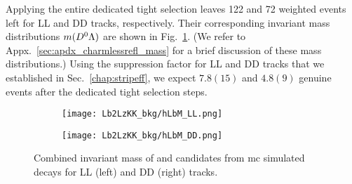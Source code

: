 Applying the entire dedicated \decay{\Lb}{\Dz\Lz} tight selection leaves 122 and 72 weighted events left for \gls{LL} and \gls{DD} tracks, respectively.
Their corresponding invariant mass distributions $m({{D}^0}{\Lambda})$ are shown in Fig.~\ref{fig:LbToLzKK_bkg_hLbM}. (We refer to Appx.~\ref{sec:apdx_charmlessrefl_mass} for a brief discussion of these mass distributions.)
Using the suppression factor for \gls{LL} and \gls{DD} tracks that we established in Sec.~\ref{chap:stripeff}, we expect $7.8(15)$ and $4.8(9)$ genuine \decay{\Lb}{\Lz\Kp\Km} events after the dedicated \decay{\Lb}{\Dz\Lz} tight selection steps.
\begin{figure}[htbp]
    \centering
    \begin{subfigure}{.49\textwidth}
        \centering
        \texttt{[image: Lb2LzKK\_bkg/hLbM\_LL.png]}
    \end{subfigure}
    \begin{subfigure}{.49\textwidth}
        \centering
        \texttt{[image: Lb2LzKK\_bkg/hLbM\_DD.png]}
    \end{subfigure}
    \caption{Combined invariant mass of \decay{\Dz}{\Km\pip} and \decay{\Lz}{\proton\pim} candidates from \gls{mc} simulated \decay{\Lb}{\Lz\Km\Kp} decays for \gls{LL} (left) and \gls{DD} (right) tracks.}
    \label{fig:LbToLzKK_bkg_hLbM}
\end{figure}


